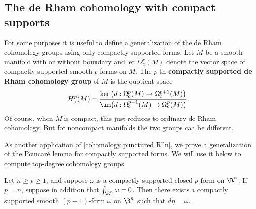 \subsection{The de Rham cohomology with compact supports}
For some purposes it is useful to define a generalization of the de Rham cohomology groups using only compactly supported forms. Let $M$ be a smooth manifold with or 
without boundary and let $\Omega^p_c(M)$ denote the vector space of compactly supported smooth $p$-forms on $M$. The $p$-th \textbf{compactly supported de Rham cohomology group} 
of $M$ is the quotient space
\[H^p_c(M)=\frac{\ker\big(d:\Omega^p_c(M)\to\Omega^{p+1}_c(M)\big)}{\im\big(d:\Omega^{p-1}_c(M)\to\Omega^{p}_c(M)\big)}.\]
Of course, when $M$ is compact, this just reduces to ordinary de Rham cohomology. But for noncompact manifolds the two groups can be different.\par
As another application of \cref{cohomology punctured R^n}, we prove a generalization of the Poincar\'e lemma for compactly supported forms. We will use it below to compute top-degree cohomology groups.
\begin{lemma}\label{Poincare lem compact suup}
Let $n\geq p\geq1$, and suppose $\omega$ is a compactly supported closed $p$-form on $\R^n$. If $p=n$, suppose in addition that $\int_{\R^n}\omega=0$. Then there exists a compactly supported smooth $(p-1)$-form $\omega$ on $\R^n$ such that $d\eta=\omega$.
\end{lemma}

